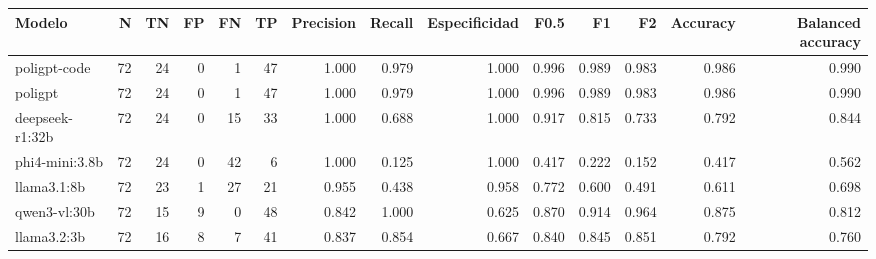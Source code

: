 \begin{tabular}{lrrrrrrrrrrrrr}
\toprule
Modelo & N & TN & FP & FN & TP & Precision & Recall & Especificidad & F0.5 & F1 & F2 & Accuracy & Balanced accuracy \\
\midrule
poligpt-code & 72 & 24 & 0 & 1 & 47 & 1.000 & 0.979 & 1.000 & 0.996 & 0.989 & 0.983 & 0.986 & 0.990 \\
poligpt & 72 & 24 & 0 & 1 & 47 & 1.000 & 0.979 & 1.000 & 0.996 & 0.989 & 0.983 & 0.986 & 0.990 \\
deepseek-r1:32b & 72 & 24 & 0 & 15 & 33 & 1.000 & 0.688 & 1.000 & 0.917 & 0.815 & 0.733 & 0.792 & 0.844 \\
phi4-mini:3.8b & 72 & 24 & 0 & 42 & 6 & 1.000 & 0.125 & 1.000 & 0.417 & 0.222 & 0.152 & 0.417 & 0.562 \\
llama3.1:8b & 72 & 23 & 1 & 27 & 21 & 0.955 & 0.438 & 0.958 & 0.772 & 0.600 & 0.491 & 0.611 & 0.698 \\
qwen3-vl:30b & 72 & 15 & 9 & 0 & 48 & 0.842 & 1.000 & 0.625 & 0.870 & 0.914 & 0.964 & 0.875 & 0.812 \\
llama3.2:3b & 72 & 16 & 8 & 7 & 41 & 0.837 & 0.854 & 0.667 & 0.840 & 0.845 & 0.851 & 0.792 & 0.760 \\
\bottomrule
\end{tabular}
